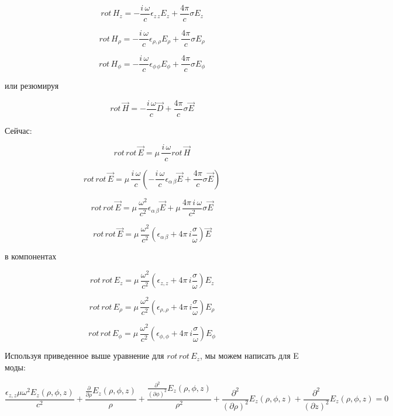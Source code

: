 \documentclass{article}
\begin{document}
$$rot\,{H}_{z} = - \frac{i\,\omega}{c} \epsilon_{z\,z} {E}_{z} + \frac{4\pi}{c} \sigma {E}_{z}$$

$$rot\,{H}_{\rho} = - \frac{i\,\omega}{c} \epsilon_{\rho,\rho} {E}_{\rho} + \frac{4\pi}{c} \sigma {E}_{\rho}$$

$$rot\,{H}_{\phi} = - \frac{i\,\omega}{c} \epsilon_{\phi\,\phi} {E}_{\phi}+ \frac{4\pi}{c} \sigma {E}_{\phi}$$

или резюмируя

$$rot\,\vec{H} = - \frac{i\,\omega}{c} \vec{D} + \frac{4\pi}{c} \sigma \vec{E}$$

Сейчас:

$$rot\,rot\,\vec{E} = \mu\,\frac{i\,\omega}{c}rot\,\vec{H}$$

$$rot\,rot\,\vec{E} = \mu\,\frac{i\,\omega}{c}\left(-\frac{i\,\omega}{c}{\epsilon}_{\alpha\,\beta}\vec{E} + \frac{4\pi}{c}\sigma\vec{E}\right)$$

$$rot\,rot\,\vec{E} = \mu\,\frac{\omega^2}{c^2} {\epsilon}_{\alpha\,\beta} \vec{E} + \mu\,\frac{4\pi\,i\,\omega}{c^2} \sigma \vec{E}$$

$$rot\,rot\,\vec{E} = \mu\,\frac{\omega^2}{c^2} \left({\epsilon}_{\alpha\,\beta} + 4\pi\,i\frac{\sigma}{\omega}\right) \vec{E}$$

в компонентах

$$rot\,rot\,{E}_{z} = \mu\,\frac{\omega^2}{c^2} \left({\epsilon}_{z,z} + 4\pi\,i\frac{\sigma}{\omega}\right) {E}_{z}$$

$$rot\,rot\,{E}_{\rho} = \mu\,\frac{\omega^2}{c^2} \left({\epsilon}_{\rho,\rho} + 4\pi\,i\frac{\sigma}{\omega}\right) {E}_{\rho}$$

$$rot\,rot\,{E}_{\phi} = \mu\,\frac{\omega^2}{c^2} \left({\epsilon}_{\phi,\phi} + 4\pi\,i\frac{\sigma}{\omega}\right) {E}_{\phi}$$

Используя приведенное выше уравнение для  $rot\,rot\,{E}_{z}$, мы можем написать для E моды:

$$\frac{{\epsilon}_{z,z} \mu \omega^{2} E_{z}\left({\rho}, {\phi}, \mathit{z}\right)}{c^{2}} + \frac{\frac{\partial}{\partial {\rho}}E_{z}\left({\rho}, {\phi}, \mathit{z}\right)}{{\rho}} + \frac{\frac{\partial^{2}}{(\partial {\phi})^{2}}E_{z}\left({\rho}, {\phi}, \mathit{z}\right)}{{\rho}^{2}} + \frac{\partial^{2}}{(\partial {\rho})^{2}}E_{z}\left({\rho}, {\phi}, \mathit{z}\right) + \frac{\partial^{2}}{(\partial \mathit{z})^{2}}E_{z}\left({\rho}, {\phi}, \mathit{z}\right) = 0$$
\end{document}
